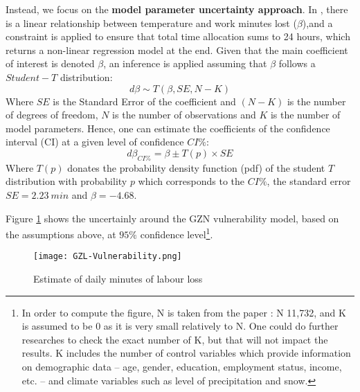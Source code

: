 \documentclass{article}
\begin{document}
Instead, we focus on the \textbf{model parameter uncertainty approach}. In \cite{ZhangAndShindell:2021}, there is a linear relationship between temperature and work minutes lost ($\beta$),and a constraint is applied to ensure that total time allocation sums to 24 hours, which returns a non-linear regression model at the end. Given that the main coefficient of interest is denoted $\beta$, an inference is applied assuming that $\beta$ follows a $Student-T$ distribution: 
\begin{equation}
 \label{Eq:uncertaintyStudentT}   
 d\beta \sim T(\beta, SE, N-K)
\end{equation}
Where $SE$ is the Standard Error of the coefficient and $(N-K)$ is the number of degrees of freedom, $N$ is the number of observations and $K$ is the number of model parameters. Hence, one can estimate the coefficients of the confidence interval (CI) at a given level of confidence $CI\%$: 
\begin{equation}
 \label{Eq:CIStudent}   
 d\beta_{CI\%} = \beta \pm T(p) \times SE
\end{equation}
Where $T(p)$ donates the probability density function (pdf) of the student $T$ distribution with probability $p$ which corresponds to the $CI\%$, the standard error $SE = 2.23 \ min$ and $\beta =  - 4.68$.


Figure \ref{fig:GZL-Vulnerability} shows the uncertainly around the GZN vulnerability model, based on the assumptions above, at $95\%$ confidence level\footnote{In order to compute the figure, N is taken from the paper \cite{TemperatureAndWork:2021}: N 11,732, and K is assumed to be 0 as it is very small relatively to N. One could do further researches to check the exact number of K, but that will not impact the results. K includes the number of control variables which provide information on demographic data -- age, gender, education, employment status, income, etc. -- and climate variables such as level of precipitation and snow.}.
\begin{figure}[h]
    \centering
    \texttt{[image: GZL-Vulnerability.png]}
    \caption{Estimate of daily minutes of labour loss}
    \label{fig:GZL-Vulnerability}
\end{figure}
\end{document}
